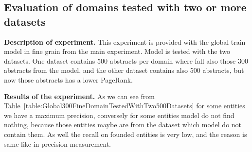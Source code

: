 \documentclass[thesis=M,english]{FITthesis}[2018/05/30]
\begin{document}
\subsection{Evaluation of domains tested with two or more datasets}\label{MixedExperiments}

\textbf{Description of experiment.} This experiment is provided with the global train model in fine grain from the main experiment. Model is tested with the two datasets. One dataset contains 500 abstracts per domain where fall also those 300 abstracts from the model, and the other dataset contains also 500 abstracts, but now those abstracts has a lower PageRank. 

\textbf{Results of the experiment.} As we can see from Table~\ref{table:Global300FineDomainTestedWithTwo500Datasets} for some entities we have a maximum precision, conversely for some entities model do not find nothing, because those entities maybe are from the dataset which model do not contain them. As well the recall on founded entities is very low, and the reason is same like in precision measurement.
\end{document}
